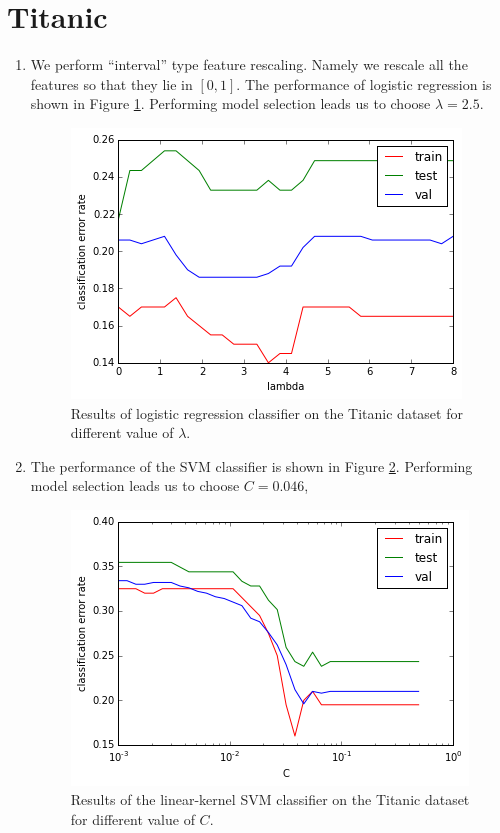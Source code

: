 \documentclass[10pt]{article}
\begin{document}
\section{Titanic}

\begin{enumerate}
\item We perform ``interval'' type feature rescaling. Namely we rescale all the features so that they lie in $[0,1]$. The performance of logistic regression is shown in Figure \ref{titanic_logit}. Performing model selection leads us to choose $\lambda = 2.5$.
 \begin{figure}
 \centering
 \includegraphics[scale=0.5]{titanic_logit.png}
 \caption{Results of logistic regression classifier on the Titanic dataset for different value of $\lambda$.}
  \label{titanic_logit}
 \end{figure}
 


 \item The performance of the SVM classifier is shown in Figure \ref{titanic_svm}.  Performing model selection leads us to choose $C=0.046$,
 
   \begin{figure}
 \centering
 \includegraphics[scale=0.5]{titanic_svm.png}
 \caption{Results of the linear-kernel SVM classifier on the Titanic dataset for different value of $C$.}
  \label{titanic_svm}
 \end{figure}


\end{enumerate}
\end{document}

